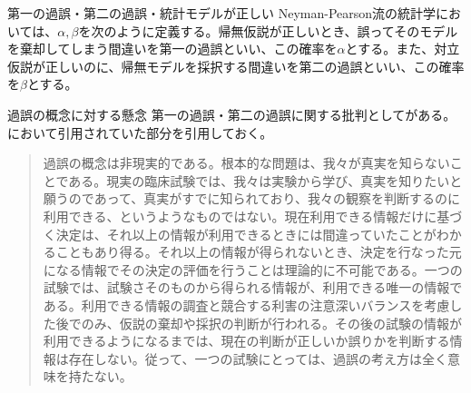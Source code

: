 \begin{SMbox}{第一の過誤・第二の過誤・統計モデルが正しい}
    Neyman-Pearson流の統計学においては、$\alpha,\beta$を次のように定義する。帰無仮説が正しいとき、誤ってそのモデルを棄却してしまう間違いを第一の過誤といい、この確率を$\alpha$とする。また、対立仮説が正しいのに、帰無モデルを採択する間違いを第二の過誤といい、この確率を$\beta$とする。



\end{SMbox}



\begin{SMbox}{過誤の概念に対する懸念}
第一の過誤・第二の過誤に関する批判として\cite{norleans2004臨床試験のための統計的方法}がある。
\cite{2010毒性試験に用いる統計解析法の動向}において引用されていた部分を引用しておく。
\begin{quote}
過誤の概念は非現実的である。根本的な問題は、我々が真実を知らないことである。現実の臨床試験では、我々は実験から学び、真実を知りたいと願うのであって、真実がすでに知られており、我々の観察を判断するのに利用できる、というようなものではない。現在利用できる情報だけに基づく決定は、それ以上の情報が利用できるときには間違っていたことがわかることもあり得る。それ以上の情報が得られないとき、決定を行なった元になる情報でその決定の評価を行うことは理論的に不可能である。一つの試験では、試験さそのものから得られる情報が、利用できる唯一の情報である。利用できる情報の調査と競合する利害の注意深いバランスを考慮した後でのみ、仮説の棄却や採択の判断が行われる。その後の試験の情報が利用できるようになるまでは、現在の判断が正しいか誤りかを判断する情報は存在しない。従って、一つの試験にとっては、過誤の考え方は全く意味を持たない。
\end{quote}
\end{SMbox}



